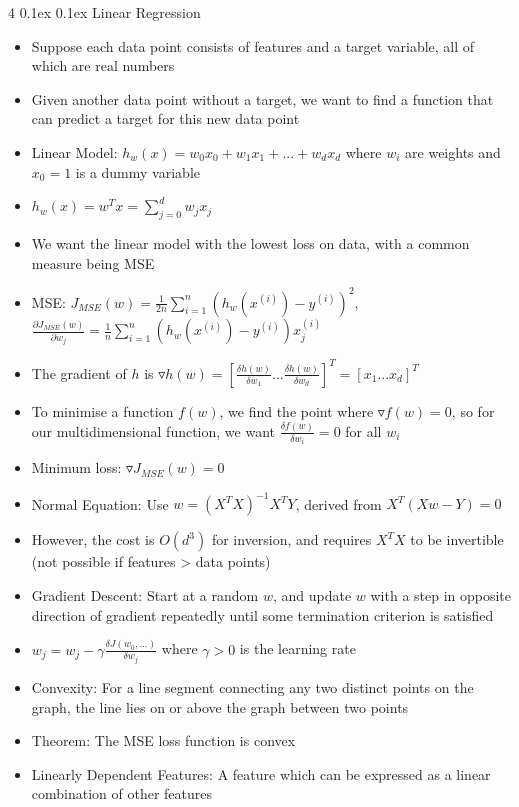 \documentclass[10pt, landscape]{article}
\makeatletter
\renewcommand{\section}{\@startsection{section}{1}{0mm}%
  {0.1ex} %
  {0.1ex} %
  {\normalfont\large\bfseries}}
\makeatother
\begin{document}
\begin{multicols*}{4}
\section{Linear Regression}
\begin{itemize}
    \item Suppose each data point consists of features and a target variable, all of which are real numbers
    \item Given another data point without a target, we want to find a function that can predict a target for this new data point
    \item Linear Model: $h_w(x)=w_0x_0+w_1x_1+...+w_dx_d$ where $w_i$ are weights and $x_0=1$ is a dummy variable
    \item $h_w(x)=w^Tx=\sum_{j=0}^dw_jx_j$
    \item We want the linear model with the lowest loss on data, with a common measure being MSE
    \item MSE: $J_{MSE}(w)=\frac{1}{2n}\sum_{i=1}^n(h_w(x^{(i)})-y^{(i)})^2$, $\frac{\partial J_{MSE}(w)}{\partial w_j}=\frac{1}{n}\sum_{i=1}^n(h_w(x^{(i)})-y^{(i)})x_j^{(i)}$
    \item The gradient of $h$ is $\triangledown h(w)=[\frac{\delta h(w)}{\delta w_1}...\frac{\delta h(w)}{\delta w_d}]^T=[x_1...x_d]^T$
    \item To minimise a function $f(w)$, we find the point where $\triangledown f(w) = 0$, so for our multidimensional function, we want $\frac{\delta f(w)}{\delta w_i}=0$ for all $w_i$
    \item Minimum loss: $\triangledown J_{MSE}(w)=0$
    \item Normal Equation: Use $w=(X^TX)^{-1}X^TY$, derived from $X^T(Xw-Y)=0$
    \item However, the cost is $O(d^3)$ for inversion, and requires $X^TX$ to be invertible (not possible if features > data points)
    \item Gradient Descent: Start at a random $w$, and update $w$ with a step in opposite direction of gradient repeatedly until some termination criterion is satisfied
    \item $w_j=w_j-\gamma\frac{\delta J(w_0,...)}{\delta w_j}$ where $\gamma>0$ is the learning rate
    \item Convexity: For a line segment connecting any two distinct points on the graph, the line lies on or above the graph between two points
    \item Theorem: The MSE loss function is convex
    \item Linearly Dependent Features: A feature which can be expressed as a linear combination of other features

\end{itemize}
\end{multicols*}
\end{document}
